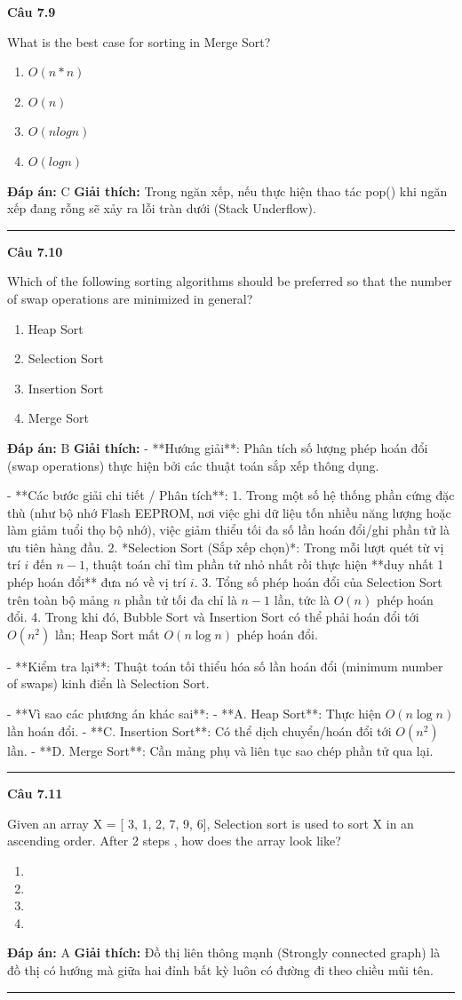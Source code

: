 \documentclass[11pt,a4paper]{article}
\newenvironment{question}[1]{%
  \par\vspace{1em}\noindent\textbf{\large Câu #1}\par\vspace{0.4em}
}{%
  \par\vspace{1em}\hrule\vspace{0.6em}
}
\newenvironment{choices}{%
  \begin{enumerate}[label=\textbf{\Alph*.},leftmargin=2.2em,itemsep=2pt,topsep=3pt]
}{%
  \end{enumerate}
}
\newcommand{\choice}{\item}
\begin{document}
\begin{question}{7.9}
What is the best case for sorting in Merge Sort?
\begin{choices}
\choice \(O(n * n)\)
\choice \(O(n)\)
\choice \(O(nlogn)\)
\choice \(O(logn)\)
\end{choices}
\textbf{Đáp án:} C
\textbf{Giải thích:} Trong ngăn xếp, nếu thực hiện thao tác pop() khi ngăn xếp đang rỗng sẽ xảy ra lỗi tràn dưới (Stack Underflow).
\end{question}

\begin{question}{7.10}
Which of the following sorting algorithms should be preferred so that the number of swap operations are minimized in general?
\begin{choices}
\choice Heap Sort
\choice Selection Sort
\choice Insertion Sort
\choice Merge Sort
\end{choices}
\textbf{Đáp án:} B
\textbf{Giải thích:} - **Hướng giải**:
  Phân tích số lượng phép hoán đổi (swap operations) thực hiện bởi các thuật toán sắp xếp thông dụng.

- **Các bước giải chi tiết / Phân tích**:
  1. Trong một số hệ thống phần cứng đặc thù (như bộ nhớ Flash EEPROM, nơi việc ghi dữ liệu tốn nhiều năng lượng hoặc làm giảm tuổi thọ bộ nhớ), việc giảm thiểu tối đa số lần hoán đổi/ghi phần tử là ưu tiên hàng đầu.
  2. *Selection Sort (Sắp xếp chọn)*: Trong mỗi lượt quét từ vị trí \(i\) đến \(n-1\), thuật toán chỉ tìm phần tử nhỏ nhất rồi thực hiện **duy nhất 1 phép hoán đổi** đưa nó về vị trí \(i\).
  3. Tổng số phép hoán đổi của Selection Sort trên toàn bộ mảng \(n\) phần tử tối đa chỉ là \(n - 1\) lần, tức là \(O(n)\) phép hoán đổi.
  4. Trong khi đó, Bubble Sort và Insertion Sort có thể phải hoán đổi tới \(O(n^2)\) lần; Heap Sort mất \(O(n \log n)\) phép hoán đổi.

- **Kiểm tra lại**:
  Thuật toán tối thiểu hóa số lần hoán đổi (minimum number of swaps) kinh điển là Selection Sort.

- **Vì sao các phương án khác sai**:
  - **A. Heap Sort**: Thực hiện \(O(n \log n)\) lần hoán đổi.
  - **C. Insertion Sort**: Có thể dịch chuyển/hoán đổi tới \(O(n^2)\) lần.
  - **D. Merge Sort**: Cần mảng phụ và liên tục sao chép phần tử qua lại.
\end{question}

\begin{question}{7.11}
Given an array X = [ 3, 1, 2, 7, 9, 6], Selection sort is used to sort X in an ascending order. After 2 steps , how does the array look like?
\begin{choices}
\choice [1, 2, 3, 7, 9, 6]
\choice [3, 1, 2, 7, 9, 6]
\choice [1, 3, 2, 7, 9, 6]
\choice [1, 2, 3, 6, 7, 9]
\end{choices}
\textbf{Đáp án:} A
\textbf{Giải thích:} Đồ thị liên thông mạnh (Strongly connected graph) là đồ thị có hướng mà giữa hai đỉnh bất kỳ luôn có đường đi theo chiều mũi tên.
\end{question}
\end{document}
